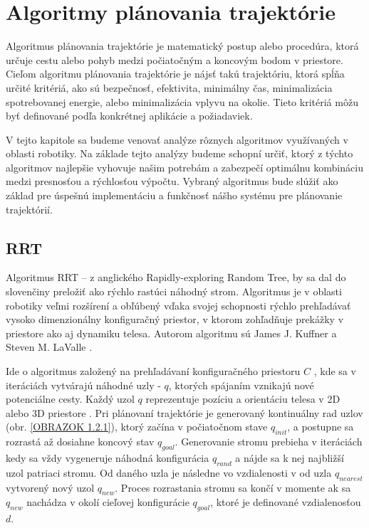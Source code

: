 \section{Algoritmy plánovania trajektórie}
\label{kap:2}
Algoritmus plánovania trajektórie je matematický postup alebo procedúra, ktorá určuje cestu alebo pohyb medzi počiatočným a koncovým bodom v priestore.
Cieľom algoritmu plánovania trajektórie je nájsť takú trajektóriu, ktorá spĺňa určité kritériá, ako sú bezpečnosť, efektivita, minimálny čas, minimalizácia spotrebovanej energie, alebo minimalizácia vplyvu na okolie. Tieto kritériá môžu byť definované podľa konkrétnej aplikácie a požiadaviek.

V tejto kapitole sa budeme venovať analýze rôznych algoritmov využívaných v oblasti robotiky. Na základe tejto analýzy budeme schopní určiť, ktorý z týchto algoritmov najlepšie vyhovuje našim potrebám a zabezpečí optimálnu kombináciu medzi presnosťou a rýchlosťou výpočtu. Vybraný algoritmus bude slúžiť ako základ pre úspešnú implementáciu a funkčnosť nášho systému pre plánovanie trajektórií.
 
\subsection{RRT}
\label{kap:2.1}

Algoritmus RRT – z anglického Rapidly-exploring Random Tree, by sa dal do slovenčiny preložiť ako rýchlo rastúci náhodný strom. Algoritmus je v oblasti robotiky veľmi rozšírení a obľúbený vďaka svojej schopnosti rýchlo prehľadávať vysoko dimenzionálny konfiguračný priestor, v ktorom zohľadňuje prekážky v priestore ako aj dynamiku telesa. Autorom algoritmu sú James J. Kuffner a Steven M. LaValle \cite{RRT-Kuffner}.

Ide o algoritmus založený na prehľadávaní konfiguračného priestoru $C$ , kde sa v iteráciách vytvárajú náhodné uzly - $q$, ktorých spájaním vznikajú nové potenciálne cesty. Každý uzol $q$ reprezentuje pozíciu a orientáciu telesa v 2D alebo 3D priestore \cite{RRT-Kuffner}. Pri plánovaní trajektórie je generovaný kontinuálny rad uzlov (obr. \ref{OBRAZOK 1.2.1}), ktorý začína v počiatočnom stave $q_{init}$,  a postupne sa rozrastá až dosiahne koncový stav $q_{goal}$.  Generovanie stromu prebieha v iteráciách kedy sa vždy vygeneruje náhodná konfigurácia $q_{rand}$ a nájde sa k nej najbližší uzol patriaci stromu. Od daného uzla je následne vo vzdialenosti v od uzla $q_{nearest}$ vytvorený nový uzol $q_{new}$. Proces rozrastania stromu sa končí v momente ak sa $q_{new}$  nachádza v okolí cieľovej konfigurácie $q_{goal}$, ktoré je definované vzdialenosťou $d$. 

